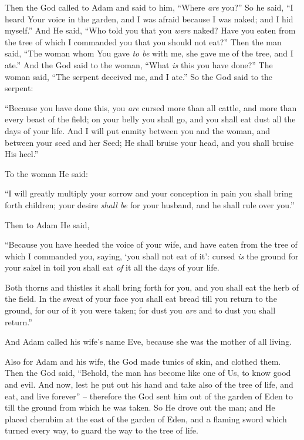 \bverse Then the \lord God called to Adam and said to him, ``Where \textit{are} you?''
\bverse So he said, ``I heard Your voice in the garden, and I was afraid because I was naked; and I hid myself.''
\bverse And He said, ``Who told you that you \textit{were} naked? Have you eaten from the tree of which I commanded you that you should not eat?''
\bverse Then the man said, ``The woman whom You gave \textit{to be} with me, she gave me of the tree, and I ate.''
\bverse And the \lord God said to the woman, ``What \textit{is} this you have done?'' The woman said, ``The serpent deceived me, and I ate.''
\bverse So the \lord God said to the serpent: 
\begin{bquotation}
``Because you have done this, you \textit{are} cursed more than all cattle, and more than every beast of the field; on your belly you shall go, and you shall eat dust all the days of your life.
\bverse And I will put enmity between you and the woman, and between your seed and her Seed; He shall bruise your head, and you shall bruise His heel.''
\end{bquotation}
\bverse To the woman He said: 
\begin{bquotation}
``I will greatly multiply your sorrow and your conception in pain you shall bring forth children; your desire \textit{shall be} for your husband, and he shall rule over you.''
\end{bquotation}
\bverse Then to Adam He said, 
\begin{bquotation}
``Because you have heeded the voice of your wife, and have eaten from the tree of which I commanded you, saying, `you shall not eat of it': cursed \textit{is} the ground for your sakel in toil you shall eat \textit{of} it all the days of your life.

\bverse Both thorns and thistles it shall bring forth for you, and you shall eat the herb of the field.
\bverse In the sweat of your face you shall eat bread till you return to the ground, for our of it you were taken; for dust you \textit{are} and to dust you shall return.''
\end{bquotation}
\bverse And Adam called his wife's name Eve, because she was the mother of all living.

\bverse Also for Adam and his wife, the \lord God made tunics of skin, and clothed them.
\bverse Then the \lord God said, ``Behold, the man has become like one of Us, to know good and evil. And now, lest he put out his hand and take also of the tree of life, and eat, and live forever'' --
\bverse therefore the \lord God sent him out of the garden of Eden to till the ground from which he was taken.
\bverse So He drove out the man; and He placed cherubim at the east of the garden of Eden, and a flaming sword which turned every way, to guard the way to the tree of life.



